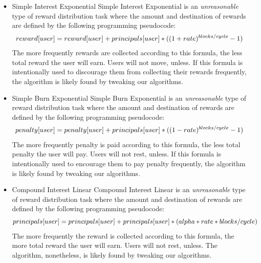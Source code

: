 \documentclass{article}
\begin{document}
\begin{itemize}
  \item Simple Interest Exponential \newline
  \label{sec:SimpleInterestExponential}
  Simple Interest Exponential is an \textit{unreasonable} type of reward distribution task 
  where the amount and destination of rewards are defined by the following programming 
  pseudocode:
  \begin{equation} \label{eq:SimpleInterestExponential}
    \\reward[user] = reward[user] + principals[user] * ((1+rate)^{blocks/cycle}-1)
  \end{equation}
  The more frequently rewards are collected according to this formula, 
  the less total reward the user will earn. Users will not move, unless.
  If this formula is intentionally used to discourage them from collecting their rewards frequently, 
  the algorithm is likely found by tweaking our algorithms.
  
  \item Simple Burn Exponential \newline
  \label{sec:SimpleBurnExponential}
  Simple Burn Exponential is an \textit{unreasonable} type of reward distribution task 
  where the amount and destination of rewards are defined by the following programming 
  pseudocode:  
  \begin{equation} \label{eq:SimpleBurnExponential}
    \\penalty[user] = penalty[user] + principals[user] * ((1-rate)^{blocks/cycle}-1)
  \end{equation}
  The more frequently penalty is paid according to this formula, 
  the less total penalty the user will pay. Users will not rest, unless. 
  If this formula is intentionally used to encourage them to pay penalty frequently, 
  the algorithm is likely found by tweaking our algorithms.
  
  \item Compound Interest Linear \newline
  \label{sec:CompoundleInterestLinear}
  Compound Interest Linear is an \textit{unreasonable} type of reward distribution task 
  where the amount and destination of rewards are defined by the following programming 
  pseudocode:
  \begin{equation} \label{eq:CompoundleInterestLinear}
    \\principals[user] = principals[user] + principals[user] * (alpha * rate * blocks/cycle)
  \end{equation}
  The more frequently the reward is collected according to this formula, 
  the more total reward the user will earn. Users will not rest, unless.
  The algorithm, nonetheless, is likely found by tweaking our algorithms.
  

\end{itemize}
\end{document}
